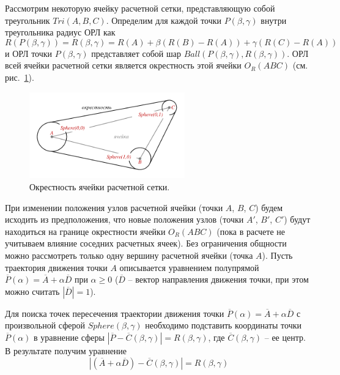Рассмотрим некоторую ячейку расчетной сетки, представляющую собой треугольник $Tri(A, B, C)$.
Определим для каждой точки $P(\beta,\gamma)$ внутри треугольника радиус ОРЛ как
\begin{equation}
	R(P(\beta,\gamma)) = R(\beta,\gamma) = R(A) + \beta(R(B) - R(A)) + \gamma(R(C) - R(A))
\end{equation}
и ОРЛ точки $P(\beta,\gamma)$ представляет собой шар $Ball(P(\beta,\gamma), R(\beta,\gamma))$.
ОРЛ всей ячейки расчетной сетки является окрестность этой ячейки $O_R(ABC)$ (см. рис.~\ref{fig:text_1_remesh_common_envelope_1}).

\begin{figure}[ht]
\centering
\includegraphics[width=0.6\textwidth]{fig/3dr_triangle.pdf}
\singlespacing
{}\caption{Окрестность ячейки расчетной сетки.}
\label{fig:text_1_remesh_common_envelope_1}
\end{figure}

При изменении положения узлов расчетной ячейки (точки $A$, $B$, $C$) будем исходить из предположения, что новые положения узлов (точки $A'$, $B'$, $C'$) будут находиться на границе окрестности ячейки $O_R(ABC)$ (пока в расчете не учитываем влияние соседних расчетных ячеек).
Без ограничения общности можно рассмотреть только одну вершину расчетной ячейки (точка $A$).
Пусть траектория движения точки $A$ описывается уравнением полупрямой $\overline{P}(\alpha) = \overline{A} + \alpha \overline{D}$ при $\alpha \ge 0$ ($\overline{D}$ -- вектор направления движения точки, при этом можно считать $|\overline{D}| = 1$).

Для поиска точек пересечения траектории движения точки $\overline{P}(\alpha) = \overline{A} + \alpha \overline{D}$ с 
произвольной сферой $Sphere(\beta,\gamma)$ необходимо подставить координаты точки $\overline{P}(\alpha)$ в уравнение сферы $|\overline{P} - \overline{C}(\beta,\gamma)| = R(\beta,\gamma)$, где $\overline{C}(\beta,\gamma)$ -- ее центр.
В результате получим уравнение
\begin{equation}\label{eqn:text_1_remesh_common_envelope_eq}
	|(\overline{A} + \alpha \overline{D}) - \overline{C}(\beta, \gamma)| = R(\beta, \gamma)
\end{equation}

